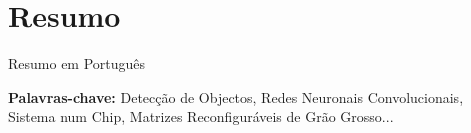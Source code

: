 
\section*{Resumo}


Resumo em Português

\vfill

\textbf{\Large Palavras-chave:} Detecção de Objectos, Redes Neuronais
Convolucionais, Sistema num Chip, Matrizes Reconfiguráveis de Grão Grosso...


